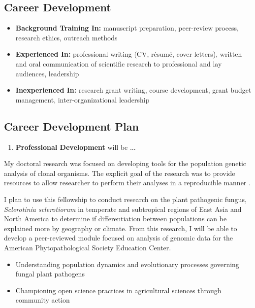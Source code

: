 \documentclass[12pt,letterpaper]{article}
\begin{document}
\subsection{Career Development}

\begin{itemize}
  \item \textbf{Background Training In: } manuscript preparation, peer-review process, research ethics, outreach methods
  \item \textbf{Experienced In: } professional writing (CV, r\'esum\'e, cover letters), written and oral communication of scientific research to professional and lay audiences, leadership
  \item \textbf{Inexperienced In: } research grant writing, course development, grant budget management, inter-organizational leadership
\end{itemize}

\subsection{Career Development Plan}

\begin{enumerate}
  \item \textbf{Professional Development} will be ...
\end{enumerate}


My doctoral research was focused on developing tools for the population genetic
analysis of clonal organisms. The explicit goal of the research was to provide
resources to allow researcher to perform their analyses in a reproducible manner
\citep{kamvar2014poppr}.

I plan to use this fellowship to conduct research on the plant pathogenic
fungus, \textit{Sclerotinia sclerotiorum} in temperate and subtropical regions
of East Asia and North America to determine if differentiation between
populations can be explained more by geography or climate. From this research, I
will be able to develop a peer-reviewed module focused on analysis of genomic
data for the American Phytopathological Society Education Center.

\begin{itemize}
  \item Understanding population dynamics and evolutionary processes governing fungal plant pathogens
  \item Championing open science practices in agricultural sciences through community action
\end{itemize}
\end{document}
